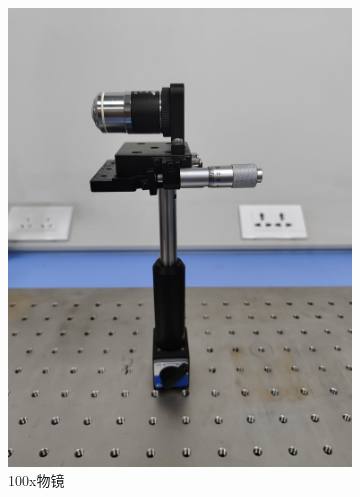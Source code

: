 \documentclass[a4paper]{report} %
\begin{document}
\begin{figure}[H]
    \begin{subfigure}{0.22\textwidth}
        \includegraphics[width=\linewidth]{100x物镜.jpg}
        \caption{100x物镜}
    \end{subfigure}
    \begin{subfigure}{0.22\textwidth}

\end{subfigure}
\end{figure}
\end{document}

